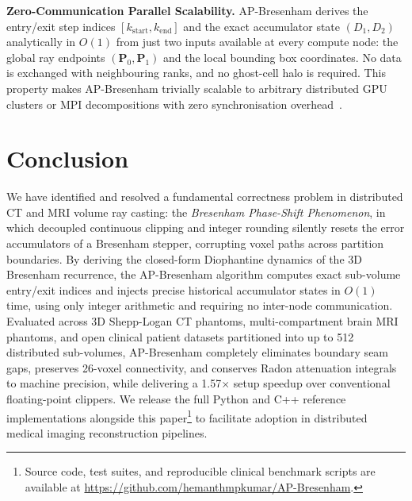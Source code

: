 \documentclass[conference]{IEEEtran}
\begin{document}
\textbf{Zero-Communication Parallel Scalability.}
AP-Bresenham derives the entry/exit step indices $[k_{\mathrm{start}}, k_{\mathrm{end}}]$ and the exact accumulator state $(D_1, D_2)$ analytically in $O(1)$ from just two inputs available at every compute node: the global ray endpoints $(\mathbf{P}_0, \mathbf{P}_1)$ and the local bounding box coordinates. No data is exchanged with neighbouring ranks, and no ghost-cell halo is required. This property makes AP-Bresenham trivially scalable to arbitrary distributed GPU clusters or MPI decompositions with zero synchronisation overhead~\cite{kim2024heterogeneous,wang2025distributed,liu2026ultra}.

\section{Conclusion}
\label{sec:conclusion}

We have identified and resolved a fundamental correctness problem in distributed CT and MRI volume ray casting: the \emph{Bresenham Phase-Shift Phenomenon}, in which decoupled continuous clipping and integer rounding silently resets the error accumulators of a Bresenham stepper, corrupting voxel paths across partition boundaries. By deriving the closed-form Diophantine dynamics of the 3D Bresenham recurrence, the AP-Bresenham algorithm computes exact sub-volume entry/exit indices and injects precise historical accumulator states in $O(1)$ time, using only integer arithmetic and requiring no inter-node communication. Evaluated across 3D Shepp-Logan CT phantoms, multi-compartment brain MRI phantoms, and open clinical patient datasets partitioned into up to 512 distributed sub-volumes, AP-Bresenham completely eliminates boundary seam gaps, preserves 26-voxel connectivity, and conserves Radon attenuation integrals to machine precision, while delivering a 1.57$\times$ setup speedup over conventional floating-point clippers. We release the full Python and C++ reference implementations alongside this paper\footnote{Source code, test suites, and reproducible clinical benchmark scripts are available at \url{https://github.com/hemanthmpkumar/AP-Bresenham}.} to facilitate adoption in distributed medical imaging reconstruction pipelines.

\def\IEEEbibitemsep{-1.0pt}


\end{document}
